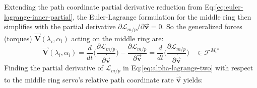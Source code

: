 Extending the path coordinate partial derivative reduction from Eq:\ref{eq:euler-lagrange-inner-partial}, the Euler-Lagrange formulation for the middle ring then simplifies with the partial derivative $\partial\mathcal{L}_{m/p}/\partial\vec{\mathbf{v}}=0$. So the generalized forces (torques) $\vec{\mathbf{V}}(\lambda_i,\alpha_i)$ acting on the middle ring are:
\begin{equation}
\vec{\mathbf{V}}(\lambda_i,\alpha_i)=\frac{d}{dt}\Bigg(\frac{\partial\mathcal{L}_{m/p}}{\partial\dot{\vec{\mathbf{v}}}}\Bigg)-\frac{\partial\mathcal{L}_{m/p}}{\partial\vec{\mathbf{v}}}=\frac{d}{dt}\Bigg(\frac{\partial\mathcal{L}_{m/p}}{\partial\dot{\vec{\mathbf{v}}}}\Bigg)~~~~\in\mathcal{F}^{M_i''}
\end{equation}
Finding the partial derivative of $\mathcal{L}_{m/p}$ in Eq:\ref{eq:alpha-lagrange-two} with respect to the middle ring servo's relative path coordinate rate $\dot{\vec{\mathbf{v}}}$ yields:
